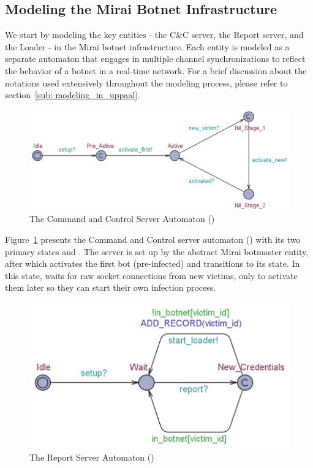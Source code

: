 \subsection{Modeling the Mirai Botnet Infrastructure}
\label{sub:modeling_botnet_infrastructure}
We start by modeling the key entities - the C\&C server, the Report server, and the Loader - in the Mirai botnet infrastructure. Each entity is modeled as a separate automaton that engages in multiple channel synchronizations to reflect the behavior of a botnet in a real-time network. For a brief discussion about the notations used extensively throughout the modeling process, please refer to section~\ref{sub: modeling_in_uppaal}.
\begin{figure}[H]
    \centering
    \includegraphics[width=\linewidth]{Figures/CnC_srv_automaton.jpg}
    \caption{The Command and Control Server Automaton (\CNC)}
    \vspace{-0.3 cm}
    \label{fig:CnC_server_automaton}
\end{figure}
\par
Figure~\ref{fig:CnC_server_automaton} presents the Command and Control server automaton (\CNC) with its two primary states  and . The server is set up by the abstract Mirai botmaster entity, after which \CNC activates the first bot (pre-infected) and transitions to its  state. In this state, \CNC waits for raw socket connections from new victims, only to activate them later so they can start their own infection process.
\begin{figure}[h!]
    \centering
    \includegraphics[width=.65\linewidth]{Figures/Report_srv_automaton.jpg}
    \caption{The Report Server Automaton (\RPT)}
    \vspace{-0.1 cm}
    \label{fig:report_server_automaton}
\end{figure}
